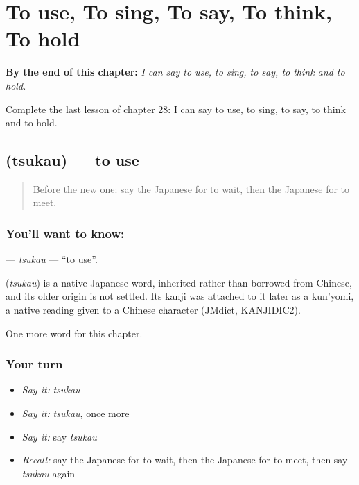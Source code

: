 
\chapter{To use, To sing, To say, To think, To hold}
\label{ch:ja-to-use-to-sing-to-say-to-think-to-hold}

\begin{chapteropening}
\textbf{By the end of this chapter:} \emph{I can say to use, to sing, to say, to think and to hold.}

Complete the last lesson of chapter 28: I can say to use, to sing, to say, to think and to hold.
\end{chapteropening}

\section[\texorpdfstring{\ja{つかう} (tsukau)}{つかう (tsukau)}]{ (tsukau) — to use}

\label{lesson:JA-C28-tsukau}



\begin{quote}
Before the new one: say the Japanese for to wait, then the Japanese for to meet.
\end{quote}

\subsection*{You'll want to know: }
\textbf{} — \emph{tsukau} — \textquotedblleft{}to use\textquotedblright{}.

\begin{cousinweb}
\textbf{} (\emph{tsukau}) is a native Japanese word, inherited rather than borrowed from Chinese, and its older origin is not settled. Its kanji was attached to it later as a kun'yomi, a native reading given to a Chinese character (JMdict, KANJIDIC2).
\end{cousinweb}

\begin{grammarlens}[title={What you've built}]
One more word for this chapter.
\end{grammarlens}

\subsection*{Your turn}
\begin{itemize}
\raggedright
  \item \emph{Say it:} \emph{tsukau}
  \item \emph{Say it:} \emph{tsukau}, once more
  \item \emph{Say it:} say \emph{tsukau}
  \item \emph{Recall:} say the Japanese for to wait, then the Japanese for to meet, then say \emph{tsukau} again
\end{itemize}

